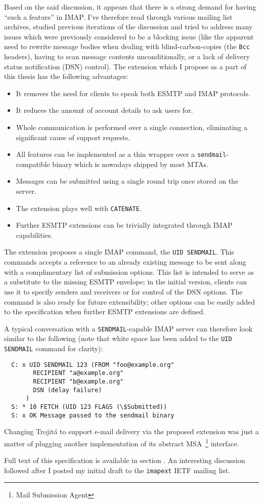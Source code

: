\documentclass[trojita]{subfiles}
\begin{document}
Based on the said discussion, it appears that there is a strong demand for having ``such a feature'' in IMAP.  I've
therefore read through various mailing list archives, studied previous iterations of the discussion and tried to address
many issues which were previously considered to be a blocking issue (like the apparent need to rewrite message bodies
when dealing with blind-carbon-copies (the {\tt Bcc} headers), having to scan message contents unconditionally, or a
lack of delivery status notification (DSN) control).  The extension which I propose as a part of this thesis has the
following advantages:

\begin{itemize}
  \item It removes the need for clients to speak both ESMTP and IMAP protocols.
  \item It reduces the amount of account details to ask users for.
  \item Whole communication is performed over a single connection, eliminating a significant cause of support requests.
  \item All features can be implemented as a thin wrapper over a {\tt sendmail}-compatible binary which is nowadays
    shipped by most MTAs.
  \item Messages can be submitted using a single round trip once stored on the server.
  \item The extension plays well with {\tt CATENATE}.
  \item Further ESMTP extensions can be trivially integrated through IMAP capabilities.
\end{itemize}

The extension proposes a single IMAP command, the {\tt UID SENDMAIL}.  This commands accepts a reference to an already
existing message to be sent along with a complimentary list of submission options.  This list is intended to serve as a
substitute to the missing ESMTP envelope; in the initial version, clients can use it to specify senders and receivers or
for control of the DSN options.  The command is also ready for future extensibility; other options can be easily added
to the specification when further ESMTP extensions are defined.

A typical conversation with a {\tt SENDMAIL}-capable IMAP server can therefore look similar to the following (note that
white space has been added to the {\tt UID SENDMAIL} command for clarity):

\begin{verbatim}
  C: x UID SENDMAIL 123 (FROM "foo@example.org"
        RECIPIENT "a@example.org"
        RECIPIENT "b@example.org"
        DSN (delay failure)
      )
  S: * 10 FETCH (UID 123 FLAGS (\$Submitted))
  S: x OK Message passed to the sendmail binary
\end{verbatim}

Changing Trojitá to support e-mail delivery via the proposed extension was just a matter of plugging another
implementation of its abstract MSA~\footnote{Mail Submission Agent} interface.

Full text of this specification is available in section .  An interesting discussion
followed \cite{jkt-i-p-draft-sendmail} after I posted my initial draft to the {\tt imapext} IETF mailing list.
\end{document}
